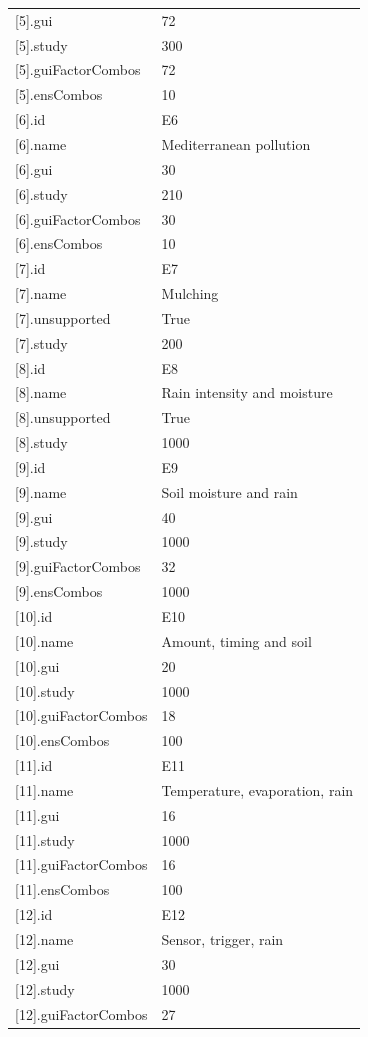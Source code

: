 {\begin{longtable}{p{}p{}}
{}[5].gui & 72\\
{}[5].study & 300\\
{}[5].guiFactorCombos & 72\\
{}[5].ensCombos & 10\\
{}[6].id & E6\\
{}[6].name & Mediterranean pollution\\
{}[6].gui & 30\\
{}[6].study & 210\\
{}[6].guiFactorCombos & 30\\
{}[6].ensCombos & 10\\
{}[7].id & E7\\
{}[7].name & Mulching\\
{}[7].unsupported & True\\
{}[7].study & 200\\
{}[8].id & E8\\
{}[8].name & Rain intensity and moisture\\
{}[8].unsupported & True\\
{}[8].study & 1000\\
{}[9].id & E9\\
{}[9].name & Soil moisture and rain\\
{}[9].gui & 40\\
{}[9].study & 1000\\
{}[9].guiFactorCombos & 32\\
{}[9].ensCombos & 1000\\
{}[10].id & E10\\
{}[10].name & Amount, timing and soil\\
{}[10].gui & 20\\
{}[10].study & 1000\\
{}[10].guiFactorCombos & 18\\
{}[10].ensCombos & 100\\
{}[11].id & E11\\
{}[11].name & Temperature, evaporation, rain\\
{}[11].gui & 16\\
{}[11].study & 1000\\
{}[11].guiFactorCombos & 16\\
{}[11].ensCombos & 100\\
{}[12].id & E12\\
{}[12].name & Sensor, trigger, rain\\
{}[12].gui & 30\\
{}[12].study & 1000\\
{}[12].guiFactorCombos & 27\\

\end{longtable}}
